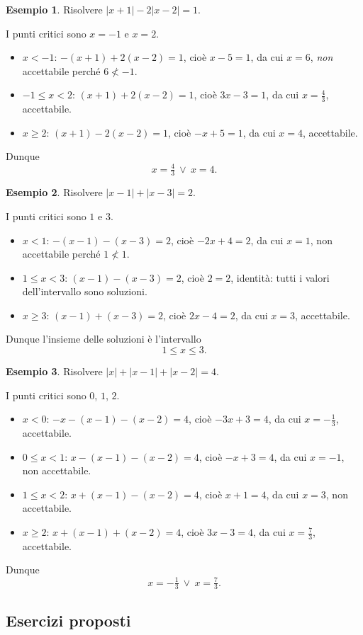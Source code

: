 \documentclass[12pt,a4paper,openany]{book}
\theoremstyle{definition}
\newtheorem{esempio}{Esempio}[section]
\theoremstyle{plain}
\theoremstyle{remark}
\newcommand{\abs}[1]{\left|#1\right|}
\begin{document}
\begin{esempio}
Risolvere $\abs{x+1}-2\abs{x-2}=1$.

I punti critici sono $x=-1$ e $x=2$.
\begin{itemize}
\item $x<-1$: $-(x+1)+2(x-2)=1$, cioè $x-5=1$, da cui $x=6$, \emph{non} accettabile perché $6\not<-1$.
\item $-1\le x<2$: $(x+1)+2(x-2)=1$, cioè $3x-3=1$, da cui $x=\tfrac43$, accettabile.
\item $x\ge 2$: $(x+1)-2(x-2)=1$, cioè $-x+5=1$, da cui $x=4$, accettabile.
\end{itemize}
Dunque
\[
x=\tfrac43\ \lor\ x=4.
\]
\end{esempio}

\begin{esempio}
Risolvere $\abs{x-1}+\abs{x-3}=2$.

I punti critici sono $1$ e $3$.
\begin{itemize}
\item $x<1$: $-(x-1)-(x-3)=2$, cioè $-2x+4=2$, da cui $x=1$, non accettabile perché $1\not<1$.
\item $1\le x<3$: $(x-1)-(x-3)=2$, cioè $2=2$, identità: tutti i valori dell'intervallo sono soluzioni.
\item $x\ge 3$: $(x-1)+(x-3)=2$, cioè $2x-4=2$, da cui $x=3$, accettabile.
\end{itemize}
Dunque l'insieme delle soluzioni è l'intervallo
\[
1\le x\le 3.
\]
\end{esempio}

\begin{esempio}
Risolvere $\abs{x}+\abs{x-1}+\abs{x-2}=4$.

I punti critici sono $0$, $1$, $2$.
\begin{itemize}
\item $x<0$: $-x-(x-1)-(x-2)=4$, cioè $-3x+3=4$, da cui $x=-\tfrac13$, accettabile.
\item $0\le x<1$: $x-(x-1)-(x-2)=4$, cioè $-x+3=4$, da cui $x=-1$, non accettabile.
\item $1\le x<2$: $x+(x-1)-(x-2)=4$, cioè $x+1=4$, da cui $x=3$, non accettabile.
\item $x\ge 2$: $x+(x-1)+(x-2)=4$, cioè $3x-3=4$, da cui $x=\tfrac73$, accettabile.
\end{itemize}
Dunque
\[
x=-\tfrac13\ \lor\ x=\tfrac73.
\]
\end{esempio}

\subsection*{Esercizi proposti}
\end{document}
